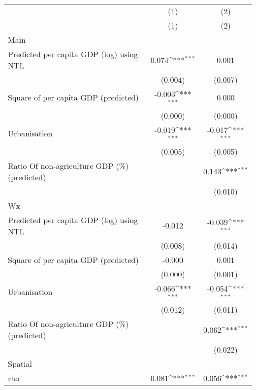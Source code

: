 {
\def\sym#1{\ifmmode^{#1}\else\(^{#1}\)\fi}
\begin{tabular}{l*{2}{c}}
\hline\hline
                    &\multicolumn{1}{c}{(1)}&\multicolumn{1}{c}{(2)}\\
                    &\multicolumn{1}{c}{(1)}&\multicolumn{1}{c}{(2)}\\
\hline
Main                &                     &                     \\
Predicted per capita GDP (log) using NTL&       0.074\sym{***}&       0.001         \\
                    &     (0.004)         &     (0.007)         \\
[1em]
Square of per capita GDP (predicted)&      -0.003\sym{***}&       0.000         \\
                    &     (0.000)         &     (0.000)         \\
[1em]
Urbanisation        &      -0.019\sym{***}&      -0.017\sym{***}\\
                    &     (0.005)         &     (0.005)         \\
[1em]
Ratio Of non-agriculture GDP (\%) (predicted)&                     &       0.143\sym{***}\\
                    &                     &     (0.010)         \\
\hline
Wx                  &                     &                     \\
Predicted per capita GDP (log) using NTL&      -0.012         &      -0.039\sym{***}\\
                    &     (0.008)         &     (0.014)         \\
[1em]
Square of per capita GDP (predicted)&      -0.000         &       0.001         \\
                    &     (0.000)         &     (0.001)         \\
[1em]
Urbanisation        &      -0.066\sym{***}&      -0.054\sym{***}\\
                    &     (0.012)         &     (0.011)         \\
[1em]
Ratio Of non-agriculture GDP (\%) (predicted)&                     &       0.062\sym{***}\\
                    &                     &     (0.022)         \\
\hline
Spatial             &                     &                     \\
rho                 &       0.081\sym{***}&       0.056\sym{***}\\

\end{tabular}}
